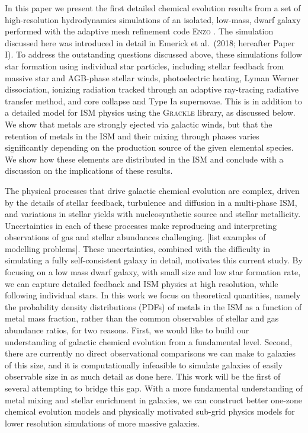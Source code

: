 \documentclass[twocolumn]{aastex61}
\begin{document}
In this paper we present the first detailed chemical evolution results from a set of high-resolution hydrodynamics simulations of an isolated, low-mass, dwarf galaxy performed with the adaptive mesh refinement code \textsc{Enzo} \citep{Enzo2014}. The simulation discussed here was introduced in detail in 
Emerick et al.\ (2018; hereafter Paper I). To address the outstanding questions discussed above, these simulations follow star formation using individual star particles, including stellar feedback from massive star and AGB-phase stellar winds, photoelectric heating, Lyman Werner dissociation, ionizing radiation tracked through an adaptive ray-tracing radiative transfer method, and core collapse and Type Ia supernovae. This is in addition to a detailed model for ISM physics using the \textsc{Grackle} library, as discussed below. We show that metals are strongly ejected via galactic winds, but that the retention of metals in the ISM and their mixing through phases varies significantly depending on the production source of the given elemental species. We show how these elements are distributed in the ISM and conclude with a discussion on the implications of these results.

The physical processes that drive galactic chemical evolution are complex, driven by the details of stellar feedback, turbulence and diffusion in a multi-phase ISM, and variations in stellar yields with nucleosynthetic source and stellar metallicity. Uncertainties in each of these processes make reproducing and interpreting observations of gas and stellar abundances challenging. [list examples of modelling problems]. These uncertainties, combined with the difficulty in simulating a fully self-consistent galaxy in detail, motivates this current study. By focusing on a low mass dwarf galaxy, with small size and low star formation rate, we can capture detailed feedback and ISM physics at high resolution, while following individual stars. In this work we focus on theoretical quantities, namely the probability density distributions (PDFs) of metals in the ISM as a function of metal mass fraction, rather than the common observables of stellar and gas abundance ratios, for two reasons. First, we would like to build our understanding of galactic chemical evolution from a fundamental level. Second, there are currently no direct observational comparisons we can make to galaxies of this size, and it is computationally infeasible to simulate galaxies 
  of easily observable size
in as much detail as done here. This work will be the first of several attempting to bridge this gap. With a more fundamental understanding of metal mixing and stellar enrichment in galaxies, we can construct better one-zone chemical evolution models and physically motivated sub-grid physics models for lower resolution simulations of more massive galaxies.
\end{document}
